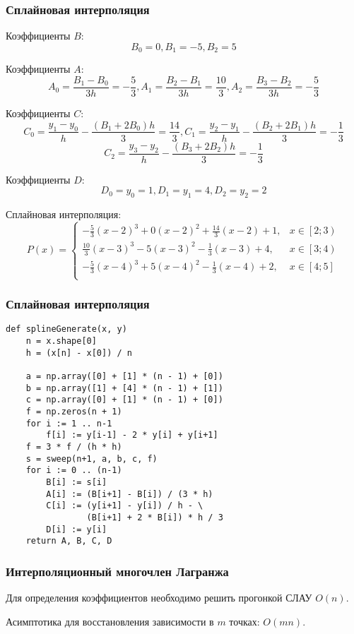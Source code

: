 \documentclass[10pt]{beamer}
\begin{document}
\begin{frame}[fragile]
\frametitle{Сплайновая интерполяция}

Коэффициенты $B$:
$$ B_0 = 0, B_1 = -5,  B_2 = 5$$

Коэффициенты $A$:
$$ A_0 = \frac{B_{1} - B_{0}}{3 h} = -\frac53,  A_1 = \frac{B_{2} - B_{1}}{3 h} = \frac{10}{3},  A_2 = \frac{B_{3} - B_{2}}{3 h} = -\frac{5}{3}$$

Коэффициенты $C$:
$$ C_0 = \frac{y_1 - y_0}{h} - \frac{(B_1 + 2 B_0) h}{3}= \frac{14}{3} ,  C_1 = \frac{y_2 - y_1}{h} - \frac{(B_2 + 2 B_1) h}{3} = -\frac13$$
$$C_2 = \frac{y_3 - y_2}{h} - \frac{(B_3 + 2 B_2) h}{3} = -\frac13$$

Коэффициенты $D$:
$$ D_0 = y_0 = 1,  D_1 = y_1 = 4,  D_2 = y_2 = 2$$

Сплайновая интерполяция:
$$
P(x) = 
\begin{cases}
-\frac{5}{3}(x-2)^3+0(x-2)^2 + \frac{14}{3}(x-2)+1, & x \in \left[2;3\right) \\
\frac{10}{3}\left(x-3\right)^3 - 5\left(x-3\right)^2 -\frac13\left(x-3\right) + 4,& x \in \left[3;4\right)	\\
-\frac{5}{3}\left(x-4\right)^3 + 5\left(x-4\right)^2 -\frac13\left(x-4\right) + 2,& x \in \left[4;5\right]	\\
\end{cases}
$$
\end{frame}

\begin{frame}[fragile]
\frametitle{Сплайновая интерполяция}

\begin{lstlisting}
def splineGenerate(x, y)
	n = x.shape[0]
    h = (x[n] - x[0]) / n

    a = np.array([0] + [1] * (n - 1) + [0])
    b = np.array([1] + [4] * (n - 1) + [1])
    c = np.array([0] + [1] * (n - 1) + [0])
    f = np.zeros(n + 1)
    for i := 1 .. n-1
        f[i] := y[i-1] - 2 * y[i] + y[i+1]
    f = 3 * f / (h * h)
    s = sweep(n+1, a, b, c, f)
    for i := 0 .. (n-1)
        B[i] := s[i]
        A[i] := (B[i+1] - B[i]) / (3 * h)
        C[i] := (y[i+1] - y[i]) / h - \
                (B[i+1] + 2 * B[i]) * h / 3
        D[i] := y[i]
    return A, B, C, D
\end{lstlisting}


\end{frame}

\begin{frame}[fragile]
\frametitle{Интерполяционный многочлен Лагранжа}

Для определения коэффициентов необходимо решить прогонкой СЛАУ $O(n)$. 

\vfill

Асимптотика для восстановления зависимости в $m$ точках: $O(m n)$. 

\end{frame}
\end{document}
